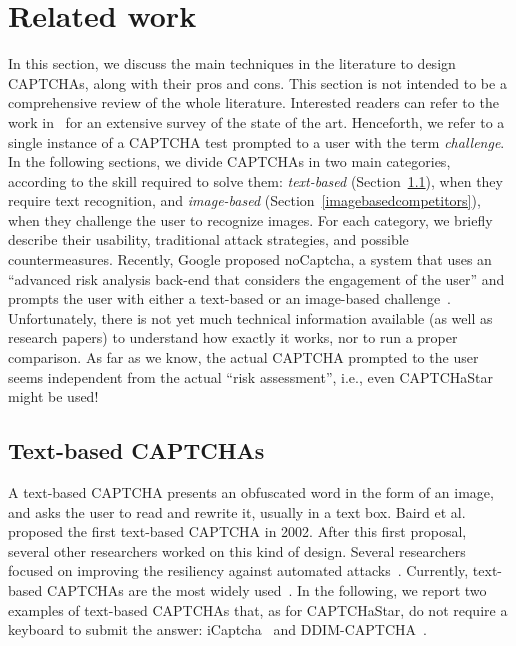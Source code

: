 \documentclass[conference]{IEEEtran}
\begin{document}
\section{Related work}
\label{relatedwork}
In this section, we discuss the main techniques in the literature to design CAPTCHAs, along with their pros and cons.
This section is not intended to be a comprehensive review of the whole literature.
Interested readers can refer to the work in~\cite{shiralidistinguishing} for an extensive survey of the state of the art.
Henceforth, we refer to a single instance of a CAPTCHA test prompted to a user with the term \textit{challenge}.
In the following sections, we divide CAPTCHAs in two main categories, according to the skill required to solve them: 
\textit{text-based} (Section~\ref{tbcaptcha}), when they require text recognition, and \textit{image-based} (Section~\ref{imagebasedcompetitors}), when they challenge the user to recognize images. 
For each category, we briefly describe their usability, traditional attack strategies, and possible countermeasures. Recently, Google proposed noCaptcha, a system that uses an ``advanced risk analysis back-end that considers the engagement of the user'' and prompts the user with either a text-based or an image-based challenge~\cite{googlenocaptcha}. Unfortunately, there is not yet much technical information available (as well as research papers) to understand how exactly it works, nor to run a proper comparison. 
As far as we know, the actual CAPTCHA prompted to the user seems independent from the actual ``risk assessment'', i.e., even CAPTCHaStar might be used!
\subsection{Text-based CAPTCHAs}
\label{tbcaptcha}
A text-based CAPTCHA presents an obfuscated word in the form of an image, and asks the user to read and rewrite it, usually in a text box.
Baird et al.~\cite{baird2003pessimalprint} proposed the first text-based CAPTCHA in 2002.
After this first proposal, several other researchers worked on this kind of design. 
Several researchers focused on improving the resiliency against automated attacks~\cite{baird2005scattertype,ferzli2006captcha,ince2008designing}. Currently, text-based CAPTCHAs are the most widely used~\cite{bursztein2011text}.
In the following, we report two examples of text-based CAPTCHAs that, as for CAPTCHaStar, do not require a keyboard to submit the answer: iCaptcha~\cite{truong2011iCAPTCHA} and DDIM-CAPTCHA~\cite{ye2013ddim}.
\end{document}
